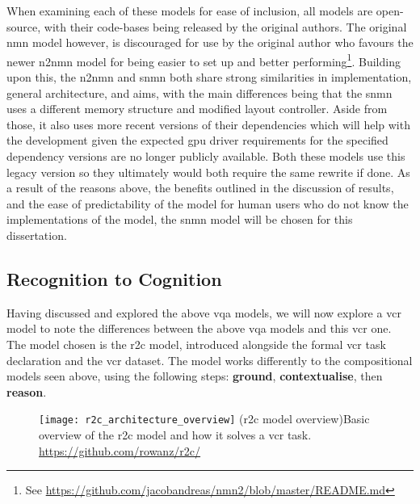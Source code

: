 When examining each of these models for ease of inclusion, all models are open-source, with their code-bases being released by the original authors.
The original \gls{nmn} model however, is discouraged for use by the original author who favours the newer \gls{n2nmn} model for being easier to set up and better performing\footnote{See \url{https://github.com/jacobandreas/nmn2/blob/master/README.md}}.
Building upon this, the \gls{n2nmn} and \gls{snmn} both share strong similarities in implementation, general architecture, and aims, with the main differences being that the \gls{snmn} uses a different memory structure and modified layout controller.
Aside from those, it also uses more recent versions of their dependencies which will help with the development given the expected \acrshort{gpu} driver requirements for the specified dependency versions are no longer publicly available.
Both these models use this legacy version so they ultimately would both require the same rewrite if done.
As a result of the reasons above, the benefits outlined in the discussion of results,
and the ease of predictability of the model for human users who do not know the implementations of the model, the \gls{snmn} model will be chosen for this dissertation.

\clearpage
\subsection{Recognition to Cognition}
\label{subsec:recognition_to_cognition}

Having discussed and explored the above \gls{vqa} models, we will now explore a \gls{vcr} model to note the differences between the above \gls{vqa} models and this \gls{vcr} one.
The model chosen is the \gls{r2c} model\cite{zellers_recognition_2019}, introduced alongside the formal \gls{vcr} task declaration and the \gls{vcr} dataset\cite{zellers_recognition_2019}.
The model works differently to the compositional models seen above, using the following steps: \textbf{ground}, \textbf{contextualise}, then \textbf{reason}.

\begin{figure}[htbp]
    \centering
    \texttt{[image: r2c\_architecture\_overview]}
    \captionsource(\acrshort{r2c} model overview){Basic overview of the \acrshort{r2c} model and how it solves a \acrshort{vcr} task. \label{fig:r2c_architecture_overview}}{\url{https://github.com/rowanz/r2c/}}
\end{figure}

